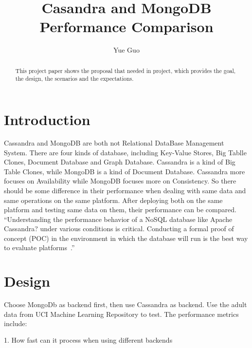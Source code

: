 
\title{Casandra and MongoDB Performance Comparison}

\author{Yue Guo}

\begin{abstract}
This project paper shows the proposal that needed in project, which 
provides the goal, the design, the scenarios and the expectations.
\end{abstract}



\maketitle


\section{Introduction}
Cassandra and MongoDB are both not Relational DataBase Management System. 
There are four kinds of database, including Key-Value Stores, Big Tablle 
Clones, Document Database and Graph Database. Cassandra is a kind of Big 
Table Clones, while MongoDB is a kind of Document Database. Cassandra more 
focuses on Availability while MongoDB focuses more on Consistency. So there
 should be some difference in their performance when dealing with same data 
 and same operations on the same platform. After deploying both on the same 
 platform and testing same data on them, their performance can be compared. 
 ``Understanding the performance behavior of a NoSQL database like Apache 
 Cassandra? under various conditions is critical. Conducting a formal proof 
 of concept (POC) in the environment in which the database will run is the 
 best way to evaluate platforms~\cite{hid-sp18-508-benchmarking}.''


\section{Design}
Choose MongoDb as backend first, then use Cassandra as backend. Use the adult
 data from UCI Machine Learning Repository to test. The performance metrics include: 

1. How fast can it process when using different backends

